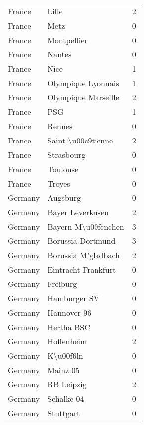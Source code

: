 \begin{tabular}{llr}
France  &                     Lille &        2 \\
France  &                      Metz &        0 \\
France  &               Montpellier &        0 \\
France  &                    Nantes &        0 \\
France  &                      Nice &        1 \\
France  &        Olympique Lyonnais &        1 \\
France  &       Olympique Marseille &        2 \\
France  &                       PSG &        1 \\
France  &                    Rennes &        0 \\
France  &        Saint-\textbackslash u00c9tienne &        2 \\
France  &                Strasbourg &        0 \\
France  &                  Toulouse &        0 \\
France  &                    Troyes &        0 \\
Germany &                  Augsburg &        0 \\
Germany &          Bayer Leverkusen &        2 \\
Germany &       Bayern M\textbackslash u00fcnchen &        3 \\
Germany &         Borussia Dortmund &        3 \\
Germany &       Borussia M'gladbach &        2 \\
Germany &       Eintracht Frankfurt &        0 \\
Germany &                  Freiburg &        0 \\
Germany &              Hamburger SV &        0 \\
Germany &               Hannover 96 &        0 \\
Germany &                Hertha BSC &        0 \\
Germany &                Hoffenheim &        2 \\
Germany &                 K\textbackslash u00f6ln &        0 \\
Germany &                  Mainz 05 &        0 \\
Germany &                RB Leipzig &        2 \\
Germany &                Schalke 04 &        0 \\
Germany &                 Stuttgart &        0 \\

\end{tabular}
